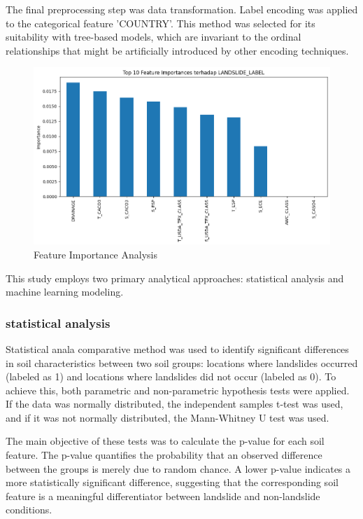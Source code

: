 The final preprocessing step was data transformation. Label encoding was applied to the categorical feature 'COUNTRY'. This method was selected for its suitability with tree-based models, which are invariant to the ordinal relationships that might be artificially introduced by other encoding techniques\cite{mthd03}. 
\begin{figure}[htbp]
    \centerline{\includegraphics[width=\linewidth]{fig4.png}}
    \caption{Feature Importance Analysis}
    \label{fig:feature-importance}
\end{figure}
This study employs two primary analytical approaches: statistical analysis and machine learning modeling.

\subsubsection{statistical analysis}
Statistical anala comparative method was used to identify significant differences in soil characteristics between two soil groups: locations where landslides occurred (labeled as 1) and locations where landslides did not occur (labeled as 0). To achieve this, both parametric and non-parametric hypothesis tests were applied. If the data was normally distributed, the independent samples t-test was used, and if it was not normally distributed, the Mann-Whitney U test was used\cite{mthd04}.

The main objective of these tests was to calculate the p-value for each soil feature. The p-value quantifies the probability that an observed difference between the groups is merely due to random chance. A lower p-value indicates a more statistically significant difference, suggesting that the corresponding soil feature is a meaningful differentiator between landslide and non-landslide conditions.

